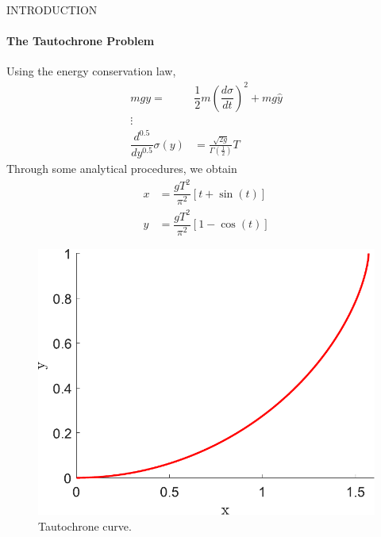 \begin{frame}{INTRODUCTION}
\begin{multicols}{2}
    \framesubtitle{The Tautochrone Problem}
    Using the energy conservation law,
    \begin{align*}
         mgy =& \dfrac{1}{2}m\left(\dfrac{d\sigma}{dt}\right)^2 + mg\hat{y}\\
         \vdots\\
        \dfrac{d^{0.5}}{dy^{0.5}} \sigma ( y ) &= \frac { \sqrt { 2 g } } { \Gamma \left( \frac { 1 } { 2 } \right) } T
    \end{align*}
    Through some analytical procedures, we obtain
    \begin{align*}
        x &= \dfrac{gT^2}{\pi^2}[t+\sin(t)]\\
        y &= \dfrac{gT^2}{\pi^2}[1-\cos(t)]
    \end{align*}
    
    \columnbreak
    \begin{figure}[H]
        \centering
        \includegraphics[scale=0.4]{files/tautochrone.pdf}
        \caption{Tautochrone curve.}
        \label{fig:my_label}
    \end{figure}
    \end{multicols}
\end{frame}